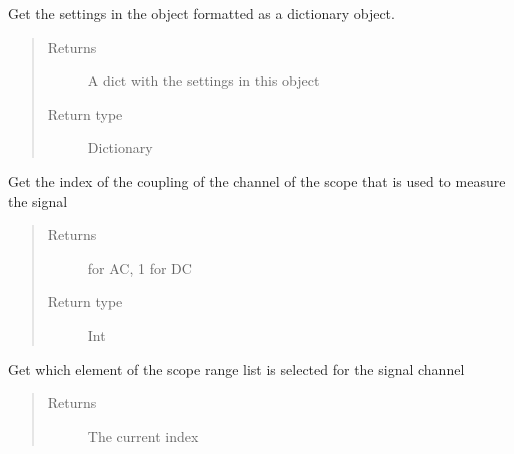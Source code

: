 \documentclass[letterpaper,10pt,english]{sphinxmanual}
\begin{document}
\begin{fulllineitems}
\begin{fulllineitems}
\label{\detokenize{index:TiePieLCR_settings.TiePieLCR_settings.get_settings_dict}}
\sphinxAtStartPar
Get the settings in the object formatted as a dictionary object.
\begin{quote}\begin{description}
\item[{Returns}] \leavevmode
\sphinxAtStartPar
A dict with the settings in this object

\item[{Return type}] \leavevmode
\sphinxAtStartPar
Dictionary

\end{description}\end{quote}

\end{fulllineitems}


\begin{fulllineitems}
\label{\detokenize{index:TiePieLCR_settings.TiePieLCR_settings.get_signal_scope_coupling}}
\sphinxAtStartPar
Get the index of the coupling of the channel of the scope that is used to measure the signal
\begin{quote}\begin{description}
\item[{Returns}] \leavevmode
{} for AC, 1 for DC

\item[{Return type}] \leavevmode
\sphinxAtStartPar
Int

\end{description}\end{quote}

\end{fulllineitems}


\begin{fulllineitems}
\label{\detokenize{index:TiePieLCR_settings.TiePieLCR_settings.get_signal_scope_range_index}}
\sphinxAtStartPar
Get which element of the scope range list is selected for the signal channel
\begin{quote}\begin{description}
\item[{Returns}] \leavevmode
\sphinxAtStartPar
The current index


\end{description}
\end{quote}
\end{fulllineitems}
\end{fulllineitems}
\end{document}
